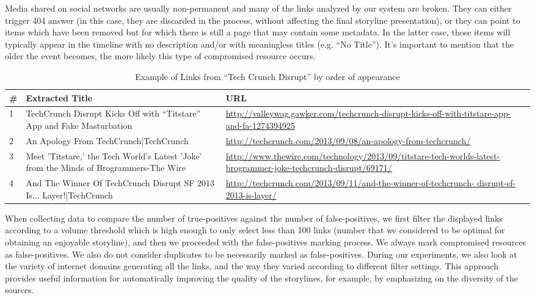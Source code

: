 \documentclass{sig-alternate-somus}
\begin{document}
Media shared on social networks are usually non-permanent and many of the links analyzed by our system are broken. They can either trigger 404 answer (in this case, they are discarded in the process, without affecting the final storyline presentation), or they can point to items which have been removed but for which there is still a page that may contain some metadata. In the latter case, those items will typically appear in the timeline with no description and/or with meaningless titles (e.g. ``No Title''). It's important to mention that the older the event becomes, the more likely this type of compromised resource occurs.

\begin{table}[htbp]
\begin{tabular}{| p{0.2cm} | p{3.5cm} | p{3.8cm} |}
  \hline
  \textbf{\#} & \textbf{Extracted Title} & \textbf{URL} \\
  \hline
  1 & TechCrunch Disrupt Kicks Off with ``Titstare'' App and Fake Masturbation & \url{http://valleywag.gawker.com/techcrunch-disrupt-kicks-off-with-titstare-app-and-fa-1274394925} \\
\hline
  2 & An Apology From TechCrunch|TechCrunch & \url{http://techcrunch.com/2013/09/08/an-apology-from-techcrunch/} \\
\hline
  3 & Meet 'Titstare,' the Tech World's Latest 'Joke' from the Minds of Brogrammers-The Wire &\url{http://www.thewire.com/technology/2013/09/titstare-tech-worlds-latest-brogrammer-joke-techcrunch-disrupt/69171/} \\
\hline
  4 & And The Winner Of TechCrunch Disrupt SF 2013 Is... Layer!|TechCrunch &\url{http://techcrunch.com/2013/09/11/and-the-winner-of-techcrunch- disrupt-sf-2013-is-layer/} \\
\hline
\end{tabular}
\caption{Example of Links from ``Tech Crunch Disrupt'' by order of appearance}
\label{tab:tcdisrupt}
\end{table}

When collecting data to compare the number of true-positives against the number of false-positives, we first filter the displayed links according to a volume threshold which is high enough to only select less than 100 links (number that we considered to be optimal for obtaining an enjoyable storyline), and then we proceeded with the false-positives marking process. We always mark compromised resources as false-positives. We also do not consider duplicates to be necessarily marked as false-positives. During our experiments, we also look at the variety of internet domains generating all the links, and the way they varied according to different filter settings. This approach provides useful information for automatically improving the quality of the storylines, for example, by emphasizing on the diversity of the sources.
\end{document}
